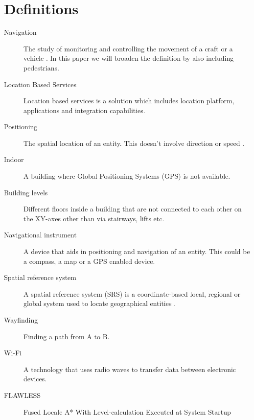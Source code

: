 \section{Definitions} %
\label{sec:definitions}

\begin{description}
	\item[Navigation] The study of monitoring and controlling the movement of a craft or a vehicle \cite{wiki_navi}. In this paper we will broaden the definition by also including pedestrians.

	\item[Location Based Services] Location based services is a solution which includes location platform, applications and integration capabilities.
	
	\item[Positioning] The spatial location of an entity. This doesn't involve direction or speed \cite{wiki_pos}.
	
	\item[Indoor] A building where Global Positioning Systems (GPS) is not available.
	
	\item[Building levels] Different floors inside a building that are not connected to each other on the XY-axes other than via stairways, lifts etc.
	
	\item[Navigational instrument] A device that aids in positioning and navigation of an entity. This could be a compass, a map or a GPS enabled device.
	
	
	\item[Spatial reference system] A spatial reference system (SRS) is a coordinate-based local, regional or global system used to locate geographical entities \cite{wiki_srs}.

	\item[Wayfinding]Finding a path from A to B.
	
	\item[Wi-Fi] A technology that uses radio waves to transfer data between electronic devices.
	
	\item[FLAWLESS] Fused Locale A* With Level-calculation Executed at System Startup

\end{description}

